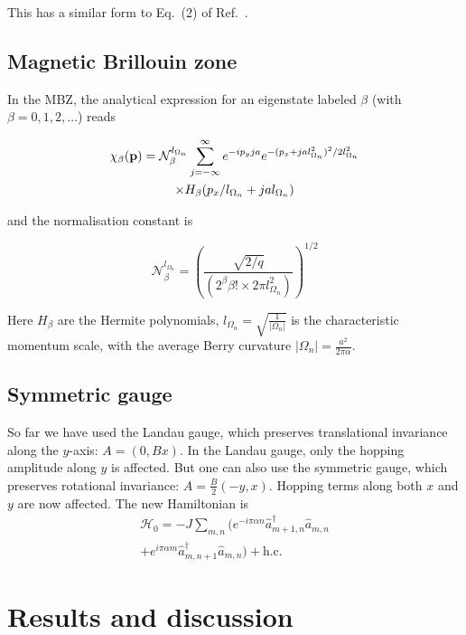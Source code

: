 \documentclass[twocolumn, 10pt, aps, superscriptaddress, floatfix, showpacs, prb, citeautoscript]{revtex4-1}
\begin{document}
This has a similar form to Eq.~(2) of Ref.~.

\subsection{Magnetic Brillouin zone}
In the MBZ, the analytical expression for an eigenstate labeled $\beta$ (with
$\beta= 0,1,2,\dots$) reads

\begin{multline}
 \chi_\beta ( {\bf p}) = \mathcal{N}_\beta^{l_{\Omega_n}} \sum_{j = -
 \infty}^{\infty} e^{- i p_y j a} e^{ - ( p_x + j a l_{\Omega_n}^2 )
 ^2 / 2 l_{\Omega_n}^2}\\
 \times H_\beta ( p_x / l_{\Omega_n} + j a
 l_{\Omega_n})
\end{multline}

and the normalisation constant is

\begin{equation}
\mathcal{N}_\beta^{l_{\Omega_n}} = \left( \frac{\sqrt{2/q}} {(2^\beta
\beta! \times 2 \pi l_{\Omega_n}^2)} \right)^{1/2}
\end{equation}

Here $H_\beta$ are the Hermite polynomials, $l_{\Omega_n} =
\sqrt{\frac{1}{|\Omega_n|}}$ is the characteristic momentum scale,
with the average Berry curvature $|\Omega_n| = \frac{a^2}{2\pi\alpha}$.

\subsection{Symmetric gauge}
So far we have used the Landau gauge, which preserves translational
invariance along the $y$-axis: $A = (0, Bx)$. In the Landau gauge,
only the hopping amplitude along $y$ is affected.  But one can also
use the symmetric gauge, which preserves rotational invariance: $A =
\frac{B}{2}(-y, x)$. Hopping terms along both $x$ and $y$ are now
affected.  The new Hamiltonian is
\begin{multline}
\mathcal{H}_0=-J\sum_{m,n}(e^{-i\pi\alpha
n}\hat{a}_{m+1,n}^{\dagger}\hat{a}_{m,n}\\
+e^{i\pi\alpha
m}\hat{a}_{m,n+1}^{\dagger}\hat{a}_{m,n}) + \text{h.c.}
\end{multline}

\section{Results and discussion}
\label{sec:results}
\end{document}
